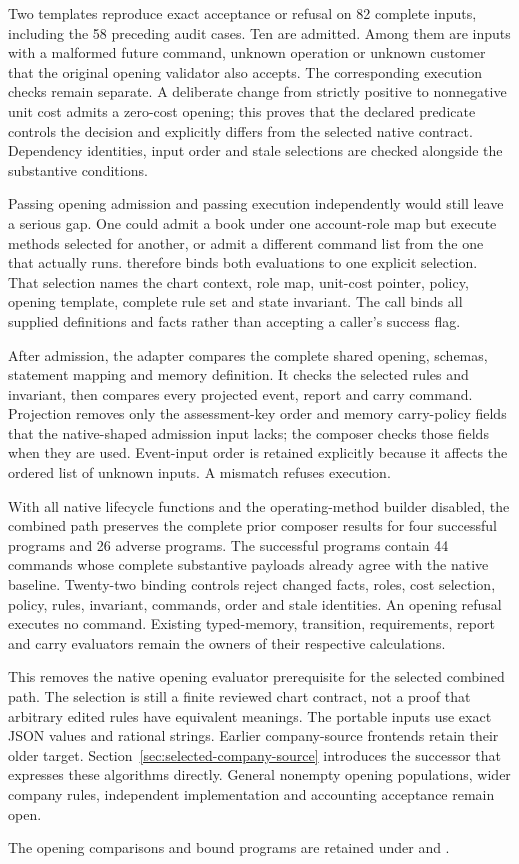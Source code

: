 Two templates reproduce exact acceptance or refusal on 82 complete inputs,
including the 58 preceding audit cases. Ten are admitted. Among them are
inputs with a malformed future command, unknown operation or unknown customer
that the original opening validator also accepts. The corresponding execution
checks remain separate. A deliberate change from strictly positive to
nonnegative unit cost admits a zero-cost opening; this proves that the declared
predicate controls the decision and explicitly differs from the selected native
contract. Dependency identities, input order and stale selections are checked
alongside the substantive conditions.

Passing opening admission and passing execution independently would still
leave a serious gap. One could admit a book under one account-role map but
execute methods selected for another, or admit a different command list from
the one that actually runs.  therefore binds
both evaluations to one explicit selection. That selection names the chart
context, role map, unit-cost pointer, policy, opening template, complete rule set
and state invariant. The call binds all supplied definitions and facts rather
than accepting a caller's success flag.

After admission, the adapter compares the complete shared opening, schemas,
statement mapping and memory definition. It checks the selected rules and
invariant, then compares every projected event, report and carry command.
Projection removes only the assessment-key order and memory carry-policy fields
that the native-shaped admission input lacks; the composer checks those fields
when they are used. Event-input order is retained explicitly because it affects
the ordered list of unknown inputs. A mismatch refuses execution.

With all native lifecycle functions and the operating-method builder disabled,
the combined path preserves the complete prior composer results for four
successful programs and 26 adverse programs. The successful programs contain
44 commands whose complete substantive payloads already agree with the native
baseline. Twenty-two binding controls reject changed facts, roles, cost
selection, policy, rules, invariant, commands, order and stale identities.
An opening refusal executes no command. Existing typed-memory, transition,
requirements, report and carry evaluators remain the owners of their respective
calculations.

This removes the native opening evaluator prerequisite for the selected
combined path. The selection is still a finite reviewed chart contract, not
a proof that arbitrary edited rules have equivalent meanings. The portable
inputs use exact JSON values and rational strings. Earlier company-source
frontends retain their older target. Section~\ref{sec:selected-company-source}
introduces the successor that expresses these algorithms directly. General nonempty opening populations, wider company rules,
independent implementation and accounting acceptance remain open.

\begingroup\raggedright
The opening comparisons and bound programs are retained under
and .
\par
\endgroup
